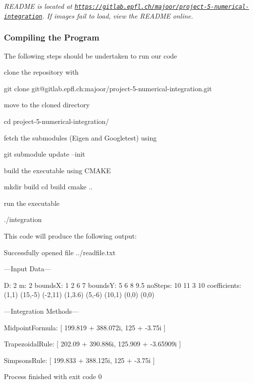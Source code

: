 {\itshape R\+E\+A\+D\+ME is located at \href{https://gitlab.epfl.ch/majoor/project-5-numerical-integration}{\tt https\+://gitlab.\+epfl.\+ch/majoor/project-\/5-\/numerical-\/integration}. If images fail to load, view the R\+E\+A\+D\+ME online.}

\subsubsection*{Compiling the Program}

The following steps should be undertaken to run our code
\begin{DoxyItemize}
\item clone the repository with 
\begin{DoxyCode}
git clone git@gitlab.epfl.ch:majoor/project-5-numerical-integration.git
\end{DoxyCode}

\item move to the cloned directory 
\begin{DoxyCode}
cd project-5-numerical-integration/
\end{DoxyCode}

\item fetch the submodules (Eigen and Googletest) using 
\begin{DoxyCode}
git submodule update --init
\end{DoxyCode}

\item build the executable using C\+M\+A\+KE 
\begin{DoxyCode}
mkdir build
cd build
cmake ..
\end{DoxyCode}

\item run the executable 
\begin{DoxyCode}
./integration
\end{DoxyCode}

\end{DoxyItemize}

This code will produce the following output\+: 
\begin{DoxyCode}
Successfully opened file ../readfile.txt

---Input Data---

D: 2
m: 2
boundsX: 
1 2
6 7
boundsY: 
  5   6
  8 9.5
noSteps: 
10 11
 3 10
coefficients: 
  (1,1) (15,-5) (-2,11) (1,3.6)
 (5,-6)  (10,1)   (0,0)   (0,0)

---Integration Methods---

MidpointFormula:
[ 199.819 + 388.072i,
125 + -3.75i ]

TrapezoidalRule:
[ 202.09 + 390.886i,
125.909 + -3.65909i ]

SimpsonsRule:
[ 199.833 + 388.125i,
125 + -3.75i ]


Process finished with exit code 0
\end{DoxyCode}


